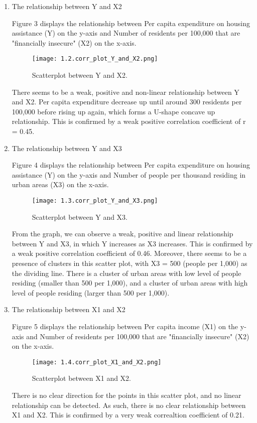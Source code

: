 \documentclass[12pt,letterpaper]{article}
\begin{document}
\begin{enumerate}
\begin{enumerate}
		\item The relationship between Y and X2
			
		Figure 3 displays the relationship between Per capita expenditure on housing assistance (Y) on the y-axis and Number of residents per 100,000 that are "financially insecure" (X2) on the x-axis.
		\begin{figure}[H]\centering
			\caption{\footnotesize Scatterplot between Y and X2.}
			\label{fig:plot_1}
			\texttt{[image: 1.2.corr\_plot\_Y\_and\_X2.png]}
		\end{figure}
		There seems to be a weak, positive and non-linear relationship between Y and X2. Per capita expenditure decrease up until around 300 residents per 100,000 before rising up again, which forms a U-shape concave up relationship. This is confirmed by a weak positive correlation coefficient of r = 0.45.
		
		\item The relationship between Y and X3
			
		Figure 4 displays the relationship between Per capita expenditure on housing assistance (Y) on the y-axis and Number of people per thousand residing in urban areas (X3) on the x-axis.
		\begin{figure}[H]\centering
			\caption{\footnotesize Scatterplot between Y and X3.}
			\label{fig:plot_1}
			\texttt{[image: 1.3.corr\_plot\_Y\_and\_X3.png]}
		\end{figure}
		From the graph, we can observe a weak, positive and linear relationship between Y and X3, in which Y increases as X3 increases. This is confirmed  by a weak positive correlation coefficient of 0.46. Moreover, there seems to be a presence of clusters in this scatter plot, with X3 = 500 (people per 1,000) as the dividing line. There is a cluster of urban areas with low level of people residing (smaller than 500 per 1,000), and a cluster of urban areas with high level of people residing (larger than 500 per 1,000).
		
		\item The relationship between X1 and X2
			
		Figure 5 displays the relationship between Per capita income (X1) on the y-axis and Number of residents per 100,000 that are "financially insecure" (X2) on the x-axis.
		\begin{figure}[H]\centering
			\caption{\footnotesize Scatterplot between X1 and X2.}
			\label{fig:plot_1}
			\texttt{[image: 1.4.corr\_plot\_X1\_and\_X2.png]}
		\end{figure}
		There is no clear direction for the points in this scatter plot, and no linear relationship can be detected. As such, there is no clear relationship between X1 and X2. This is confirmed by a very weak correaltion coefficient of 0.21.
		

\end{enumerate}
\end{enumerate}
\end{document}
